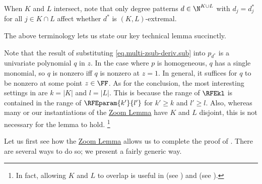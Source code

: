\documentclass{toc}
\begin{document}
When \(K\) and \(L\) intersect,
note that only degree patterns \(d \in \N^{K\cup L}\)
with \(d_j = d^*_j\) for all \(j \in K \cap L\)
affect whether \(d^*\) is \((K,L)\)-extremal.

The above terminology lets us state our key technical lemma succinctly.

Note that the result of substituting \eqref{eq.multi-zsub-deriv.sub} into $p_{d^*}$ is a univariate polynomial $q$ in $z$. In the case where $p$ is homogeneous, $q$ has a single monomial, so $q$ is nonzero iff $q$ is nonzero at $z=1$. In general, it suffices for $q$ to be nonzero at some point $z \in \FF$. As for the conclusion, the most interesting settings in  are $k=|K|$ and $l=|L|$. This is because the range of $\RFEkl$ is contained in the range of $\RFEparam{k'}{l'}$ for $k'\ge k$ and $l'\ge l$. Also, whereas many or our instantiations of the \hyperref[lem.multi-zsub-deriv]{Zoom Lemma} have \(K\) and \(L\) disjoint,
this is not necessary for the lemma to hold.%
\footnote{%
  In fact, allowing \(K\) and \(L\) to overlap is useful in
   (see ) and 
   (see ).%
}

Let us first see how the \hyperref[lem.multi-zsub-deriv]{Zoom Lemma} allows us to complete the proof of
. There are several ways to do so; we present a fairly generic way.
\end{document}
